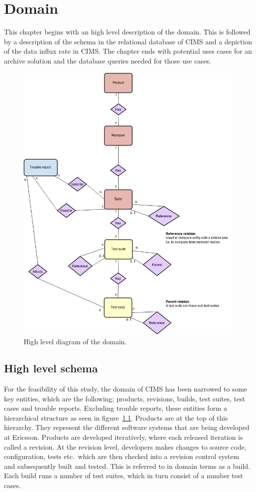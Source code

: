 \chapter{Domain}
\label{chap:domain}

This chapter begins with an high level description of the domain. This is followed by a description of the schema in the relational database of CIMS and a depiction of the data influx rate in CIMS. The chapter ends with potential uses cases for an archive solution and the database queries needed for those use cases.
\begin{figure}[h!]
\centering
\includegraphics[scale=0.5]{figure/er_diagram.png}
\caption{High level diagram of the domain.}
\label{fig:er}
\end{figure}

\section{High level schema}
For the feasibility of this study, the domain of CIMS has been narrowed to some key entities, which are the following; products, revisions, builds, test suites, test cases and trouble reports. Excluding trouble reports, these entities form a hierarchical structure as seen in figure~\ref{fig:er}. Products are at the top of this hierarchy. They represent the different software systems that are being developed at Ericsson. Products are developed iteratively, where each released iteration is called a revision. At the revision level, developers makes changes to source code, configuration, tests etc.\ which are then checked into a revision control system and subsequently built and tested. This is referred to in domain terms as a build. Each build runs a number of test suites, which in turn consist of a number test cases.

